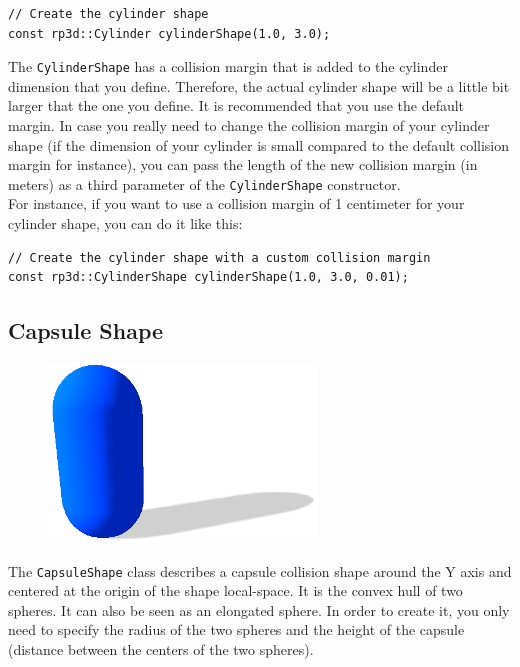 \documentclass[a4paper,12pt]{article}
\begin{document}
    \begin{lstlisting}
// Create the cylinder shape
const rp3d::Cylinder cylinderShape(1.0, 3.0);
  \end{lstlisting}

    \vspace{0.6cm}

    The \texttt{CylinderShape} has a collision margin that is added to the cylinder dimension that you define. Therefore, the actual cylinder shape will be a little bit larger that the one you define.
    It is recommended that you use the default margin. In case you really need to change the collision margin of your cylinder shape (if the dimension of your cylinder is small compared
    to the default collision margin for instance), you can pass the length of the new collision margin (in meters) as a third parameter of the \texttt{CylinderShape} constructor. \\

    For instance, if you want to use a collision margin of 1 centimeter for your cylinder shape, you can do it like this: \\

   \begin{lstlisting}
// Create the cylinder shape with a custom collision margin
const rp3d::CylinderShape cylinderShape(1.0, 3.0, 0.01);
  \end{lstlisting}

    \subsection{Capsule Shape}

    \begin{figure}[h]
        \centering
        \includegraphics{capsuleshape.png}
        \label{fig:capsuleshape}
    \end{figure}

    The \texttt{CapsuleShape} class describes a capsule collision shape around the Y axis and centered at the origin of the shape local-space. It is the convex hull of two
    spheres. It can also be seen as an elongated sphere. In order to create it, you only need to specify the radius of the two spheres and the height of the
    capsule (distance between the centers of the two spheres).  \\
\end{document}
